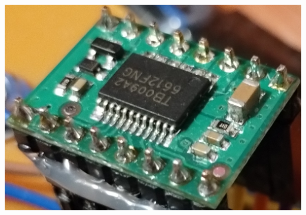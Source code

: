 \begin{center}
  \includegraphics[scale=0.25]{images/Sterownik.jpg}
  \label{fig:sterownik}
\end{center}

